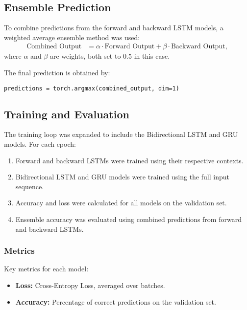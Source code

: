 \documentclass{article}
\begin{document}
\subsection{Ensemble Prediction}
To combine predictions from the forward and backward LSTM models, a weighted average ensemble method was used:
\begin{align*}
\text{Combined Output} &= \alpha \cdot \text{Forward Output} + \beta \cdot \text{Backward Output},
\end{align*}
where $\alpha$ and $\beta$ are weights, both set to 0.5 in this case.

The final prediction is obtained by:
\begin{verbatim}
predictions = torch.argmax(combined_output, dim=1)
\end{verbatim}

\subsection{Training and Evaluation}
The training loop was expanded to include the Bidirectional LSTM and GRU models. For each epoch:
\begin{enumerate}
    \item Forward and backward LSTMs were trained using their respective contexts.
    \item Bidirectional LSTM and GRU models were trained using the full input sequence.
    \item Accuracy and loss were calculated for all models on the validation set.
    \item Ensemble accuracy was evaluated using combined predictions from forward and backward LSTMs.
\end{enumerate}

\subsubsection{Metrics}
Key metrics for each model:
\begin{itemize}
    \item \textbf{Loss:} Cross-Entropy Loss, averaged over batches.
    \item \textbf{Accuracy:} Percentage of correct predictions on the validation set.
\end{itemize}
\end{document}
